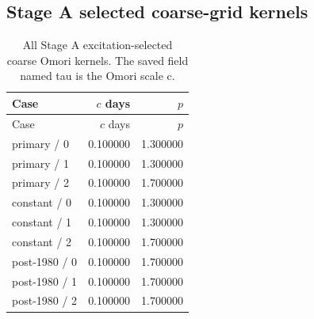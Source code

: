 \subsection{Stage A selected coarse-grid kernels}
\label{app:audit09-coarse-kernels}
{\small
\setlength{\tabcolsep}{3pt}
\begin{longtable}{lrr}
\caption{All Stage A excitation-selected coarse Omori kernels. The saved field named tau is the Omori scale c.}\label{tab:a-coarse-kernels}\\
\toprule
Case & $c$ days & $p$\\\midrule
\endfirsthead
\toprule
Case & $c$ days & $p$\\\midrule
\endhead
primary / 0 & 0.100000 & 1.300000\\
primary / 1 & 0.100000 & 1.300000\\
primary / 2 & 0.100000 & 1.700000\\
constant / 0 & 0.100000 & 1.300000\\
constant / 1 & 0.100000 & 1.300000\\
constant / 2 & 0.100000 & 1.700000\\
post-1980 / 0 & 0.100000 & 1.700000\\
post-1980 / 1 & 0.100000 & 1.700000\\
post-1980 / 2 & 0.100000 & 1.700000\\
\bottomrule
\end{longtable}
}

